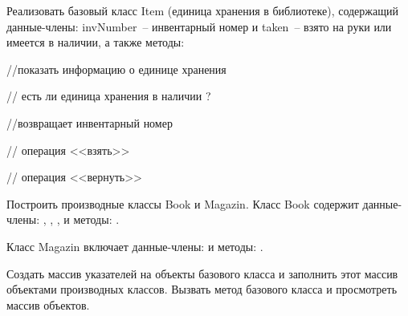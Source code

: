 Реализовать базовый класс Item (единица хранения в
		библиотеке), содержащий данные-члены:
invNumber~-- инвентарный номер и taken~--
взято на руки или имеется в наличии, а также методы:
\begin{description}
	\item{} //показать информацию о единице
		хранения
	\item{} // есть ли единица хранения в наличии ?
\item{} //возвращает инвентарный номер
\item{} // операция <<взять>>
\item{}// операция <<вернуть>>
\end{description}

Построить производные классы Book и Magazin.
Класс Book содержит данные-члены: , , ,
и методы:     .

Класс Magazin включает данные-члены:    
и методы:     .

Создать массив указателей на объекты базового класса и
заполнить этот массив объектами производных классов.
Вызвать метод  базового класса и просмотреть массив
объектов.
